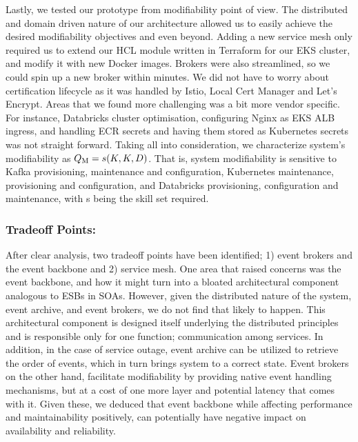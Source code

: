 \documentclass[runningheads]{llncs}
\begin{document}
Lastly, we tested our prototype from modifiability point of view. The distributed and domain driven nature of our architecture allowed us to easily achieve the desired modifiability objectives and even beyond. Adding a new service mesh only required us to extend our HCL module written in Terraform for our EKS cluster, and modify it with new Docker images. Brokers were also streamlined, so we could spin up a new broker within minutes. We did not have to worry about certification lifecycle as it was handled by Istio, Local Cert Manager and Let's Encrypt. Areas that we found more challenging was a bit more vendor specific. For instance, Databricks cluster optimisation, configuring Nginx as EKS ALB ingress, and handling ECR secrets and having them stored as Kubernetes secrets was not straight forward. Taking all into consideration, we characterize system's modifiability as $ Q\textsubscript{M} = s(K, K, D)$. That is, system modifiability is sensitive to Kafka provisioning, maintenance and configuration, Kubernetes maintenance, provisioning and configuration, and Databricks provisioning, configuration and maintenance, with s being the skill set required. 

\subsubsection{Tradeoff Points:}

After clear analysis, two tradeoff points have been identified; 1) event brokers and the event backbone and 2) service mesh. One area that raised concerns was the event backbone, and how it might turn into a bloated architectural component analogous to ESBs in SOAs. However, given the distributed nature of the system, event archive, and event brokers, we do not find that likely to happen. This architectural component is designed itself underlying the distributed principles and is responsible only for one function; communication among services. In addition, in the case of service outage, event archive can be utilized to retrieve the order of events, which in turn brings system to a correct state. Event brokers on the other hand, facilitate modifiability by providing native event handling mechanisms, but at a cost of one more layer and potential latency that comes with it. Given these, we deduced that event backbone while affecting performance and maintainability positively, can potentially have negative impact on availability
 and reliability. 
 
\end{document}
